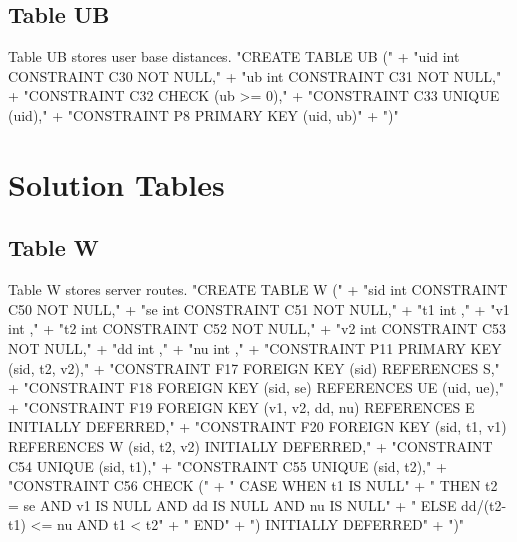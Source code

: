 \subsection{Table UB}
Table UB stores user base distances.
\nwenddocs{}\endmoddef{}
"CREATE TABLE UB ("
  + "uid int  CONSTRAINT C30 NOT NULL,"
  + "ub  int  CONSTRAINT C31 NOT NULL,"
  + "CONSTRAINT C32 CHECK (ub >= 0),"
  + "CONSTRAINT C33 UNIQUE (uid),"
  + "CONSTRAINT P8 PRIMARY KEY (uid, ub)"
  + ")"
\nwendcode{}\nwdocspar

\section{Solution Tables}

\subsection{Table W}
Table W stores server routes.
\nwenddocs{}\endmoddef{}
"CREATE TABLE W ("
  + "sid int  CONSTRAINT C50 NOT NULL,"
  + "se  int  CONSTRAINT C51 NOT NULL,"
  + "t1  int  ,"
  + "v1  int  ,"
  + "t2  int  CONSTRAINT C52 NOT NULL,"
  + "v2  int  CONSTRAINT C53 NOT NULL,"
  + "dd  int ,"
  + "nu  int ,"
  + "CONSTRAINT P11 PRIMARY KEY (sid, t2, v2),"
  + "CONSTRAINT F17 FOREIGN KEY (sid) REFERENCES S,"
  + "CONSTRAINT F18 FOREIGN KEY (sid, se) REFERENCES UE (uid, ue),"
  + "CONSTRAINT F19 FOREIGN KEY (v1, v2, dd, nu) REFERENCES E INITIALLY DEFERRED,"
  + "CONSTRAINT F20 FOREIGN KEY (sid, t1, v1) REFERENCES W (sid, t2, v2) INITIALLY DEFERRED,"
  + "CONSTRAINT C54 UNIQUE (sid, t1),"
  + "CONSTRAINT C55 UNIQUE (sid, t2),"
  + "CONSTRAINT C56 CHECK ("
  + "  CASE WHEN t1 IS NULL"
  + "    THEN t2 = se AND v1 IS NULL AND dd IS NULL AND nu IS NULL"
  + "    ELSE dd/(t2-t1) <= nu AND t1 < t2"
  + "  END"
  + ") INITIALLY DEFERRED"
  + ")"
\nwendcode{}\nwdocspar

